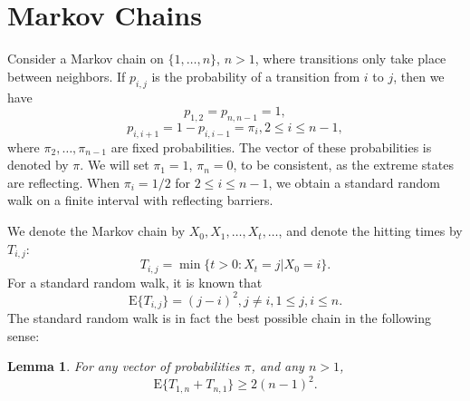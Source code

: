 \documentclass [letterpaper] {patmorin}
\newtheorem{lemma}{Lemma}%
\newcommand{\EXP}{\mathrm{E}}
\begin{document}
\section{Markov Chains}
\label{sec:markov}

Consider a Markov chain on $\{ 1, \ldots, n \}$, $n > 1$, where transitions only
take place between neighbors. If $p_{i,j}$ is the probability of a transition
from $i$ to $j$, then we have 
\[
p_{1,2} = p_{n,n-1} = 1,
\]
\[
p_{i,i+1} = 1-p_{i,i-1} = \pi_i, 2 \le i \le n-1,
\]
where $\pi_2, \ldots, \pi_{n-1}$ are fixed probabilities.
The vector of these probabilities is denoted by $\pi$.
We will set $\pi_1 = 1$, $\pi_n = 0$, to be consistent, as the
extreme states are reflecting.  When $\pi_i = 1/2$ for $2 \le i \le n-1$,
we obtain a standard random walk on a finite interval with reflecting barriers.

We denote the Markov chain by $X_0, X_1, \ldots, X_t , \ldots$,
and denote the hitting times by $T_{i,j}$:
\[
T_{i,j} = \min \{ t > 0: X_t = j | X_0 = i \}.
\]
For a standard random walk, it is known that
\[
\EXP \{ T_{i,j} \} = (j-i)^2, j \not= i, 1 \le j,i \le n.
\]
The standard random walk is in fact the best possible chain in the following sense:

\begin{lemma}\label{lemma:backandforth}
For any vector of probabilities $\pi$, and any $n > 1$,
\[
\EXP \{ T_{1,n} + T_{n,1} \} \ge 2 (n-1)^2.
\]
\end{lemma}
\end{document}
